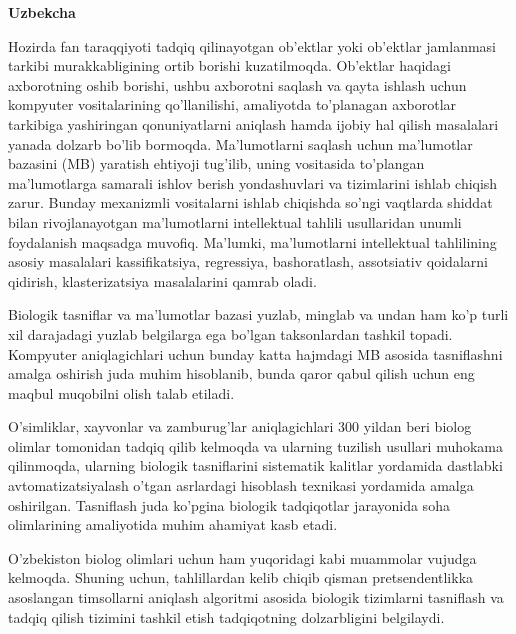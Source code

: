 

\textbf{Uzbekcha}

Hozirda fan taraqqiyoti tadqiq qilinayotgan ob'ektlar yoki ob'ektlar
jamlanmasi tarkibi murakkabligining ortib borishi kuzatilmoqda. 
Ob'ektlar haqidagi axborotning oshib borishi, ushbu axborotni saqlash 
va qayta ishlash uchun kompyuter vositalarining qo'llanilishi, amaliyotda 
to'planagan axborotlar tarkibiga yashiringan qonuniyatlarni aniqlash 
hamda ijobiy hal qilish masalalari yanada dolzarb bo'lib bormoqda. 
Ma'lumotlarni saqlash uchun ma'lumotlar bazasini (MB) yaratish ehtiyoji 
tug'ilib, uning vositasida to'plangan ma'lumotlarga samarali ishlov berish 
yondashuvlari va tizimlarini ishlab chiqish zarur. Bunday mexanizmli 
vositalarni ishlab chiqishda so'ngi vaqtlarda shiddat bilan rivojlanayotgan 
ma'lumotlarni intellektual tahlili usullaridan unumli foydalanish 
maqsadga muvofiq. Ma'lumki, ma'lumotlarni intellektual tahlilining 
asosiy masalalari kassifikatsiya, regressiya, bashoratlash, assotsiativ 
qoidalarni qidirish, klasterizatsiya masalalarini qamrab oladi. 

Biologik tasniflar va ma'lumotlar bazasi yuzlab, minglab va undan 
ham ko'p turli xil darajadagi yuzlab belgilarga ega bo'lgan taksonlardan 
tashkil topadi. Kompyuter aniqlagichlari uchun bunday katta hajmdagi MB 
asosida tasniflashni amalga oshirish juda muhim hisoblanib, bunda qaror 
qabul qilish uchun eng maqbul muqobilni olish talab etiladi.
 
O'simliklar, xayvonlar va zamburug'lar aniqlagichlari 300 
yildan beri biolog olimlar 
tomonidan tadqiq qilib kelmoqda va ularning tuzilish usullari muhokama 
qilinmoqda, ularning biologik tasniflarini sistematik kalitlar 
yordamida dastlabki avtomatizatsiyalash o'tgan asrlardagi hisoblash 
texnikasi yordamida amalga oshirilgan. Tasniflash juda ko'pgina biologik 
tadqiqotlar jarayonida soha olimlarining amaliyotida muhim ahamiyat kasb 
etadi.

O'zbekiston biolog olimlari uchun ham yuqoridagi kabi muammolar vujudga 
kelmoqda. Shuning uchun, tahlillardan kelib 
chiqib qisman pretsendentlikka asoslangan timsollarni 
aniqlash algoritmi asosida biologik tizimlarni tasniflash va tadqiq qilish 
tizimini tashkil etish tadqiqotning dolzarbligini belgilaydi.

\newpage
